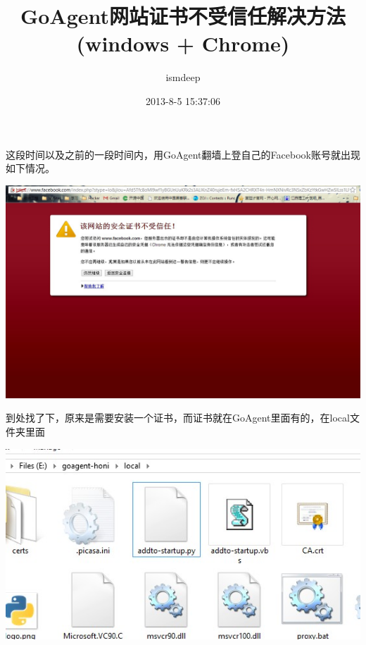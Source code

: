 \documentclass[12pt,a4paper,landscape]{article}
\begin{document}
\begin{CJK}{UTF8}{gbsn}
\title{GoAgent网站证书不受信任解决方法(windows + Chrome)}
\author{ismdeep}
\date{2013-8-5 15:37:06}


\maketitle




\newpage

这段时间以及之前的一段时间内，用GoAgent翻墙上登自己的Facebook账号就出现如下情况。


\includegraphics[scale=0.55]{pic/001.jpg}

\newpage

到处找了下，原来是需要安装一个证书，而证书就在GoAgent里面有的，在local文件夹里面

\includegraphics[scale=1.5]{pic/002.jpg}



\end{CJK}
\end{document}
